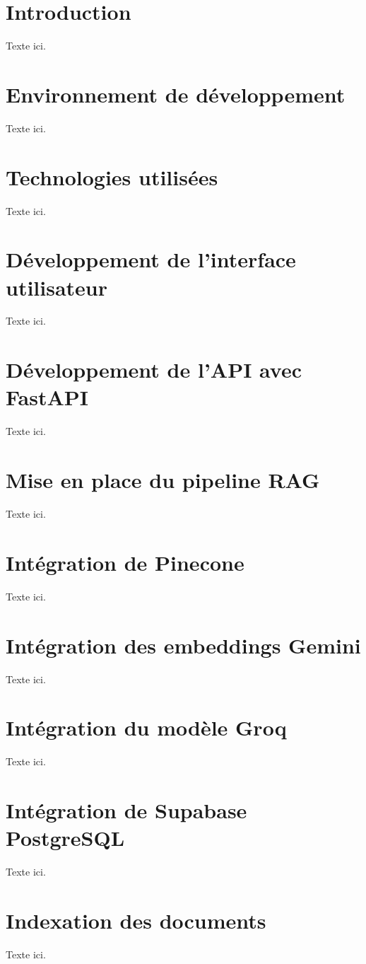 \documentclass[12pt, a4paper, twoside]{report}
\begin{document}
\section{Introduction}
Texte ici.

\section{Environnement de développement}
Texte ici.

\section{Technologies utilisées}
Texte ici.

\section{Développement de l'interface utilisateur}
Texte ici.

\section{Développement de l'API avec FastAPI}
Texte ici.

\section{Mise en place du pipeline RAG}
Texte ici.

\section{Intégration de Pinecone}
Texte ici.

\section{Intégration des embeddings Gemini}
Texte ici.

\section{Intégration du modèle Groq}
Texte ici.

\section{Intégration de Supabase PostgreSQL}
Texte ici.

\section{Indexation des documents}
Texte ici.
\end{document}

